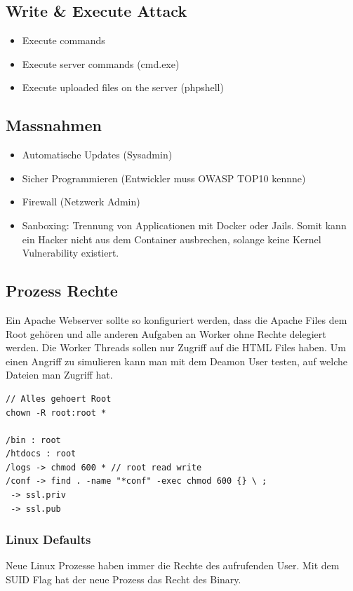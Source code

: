 \subsection{Write \& Execute Attack}
\begin{itemize}
	\item Execute commands
	\item Execute server commands (cmd.exe)
	\item Execute uploaded files on the server (phpshell)
\end{itemize}


\subsection{Massnahmen}
\begin{itemize}
	\item Automatische Updates (Sysadmin)
	\item Sicher Programmieren (Entwickler muss OWASP TOP10 kennne)
	\item Firewall (Netzwerk Admin)
	\item Sanboxing: Trennung von Applicationen mit Docker oder Jails. Somit kann ein Hacker nicht aus dem Container ausbrechen, solange keine Kernel Vulnerability existiert.
\end{itemize}

\subsection{Prozess Rechte}
Ein Apache Webserver sollte so konfiguriert werden, dass die Apache Files dem Root gehören und alle anderen Aufgaben an Worker ohne Rechte delegiert werden. Die Worker Threads sollen nur Zugriff auf die HTML Files haben. Um einen Angriff zu simulieren kann man mit dem Deamon User testen, auf welche Dateien man Zugriff hat.
\begin{lstlisting}
// Alles gehoert Root
chown -R root:root *

/bin : root
/htdocs : root
/logs -> chmod 600 * // root read write
/conf -> find . -name "*conf" -exec chmod 600 {} \ ;
 -> ssl.priv 
 -> ssl.pub
\end{lstlisting}

\subsubsection{Linux Defaults}
Neue Linux Prozesse haben immer die Rechte des aufrufenden User. Mit dem SUID Flag hat der neue Prozess das Recht des Binary.


